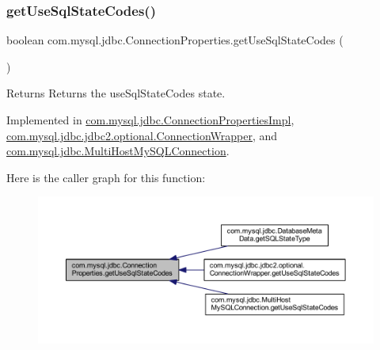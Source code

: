 \subsubsection{\texorpdfstring{get\+Use\+Sql\+State\+Codes()}{getUseSqlStateCodes()}}
{\footnotesize\ttfamily boolean com.\+mysql.\+jdbc.\+Connection\+Properties.\+get\+Use\+Sql\+State\+Codes (\begin{DoxyParamCaption}{ }\end{DoxyParamCaption})}

\begin{DoxyReturn}{Returns}
Returns the use\+Sql\+State\+Codes state. 
\end{DoxyReturn}


Implemented in \mbox{\hyperlink{classcom_1_1mysql_1_1jdbc_1_1_connection_properties_impl_a3e42bff7235239786fc02a0fba94564d}{com.\+mysql.\+jdbc.\+Connection\+Properties\+Impl}}, \mbox{\hyperlink{classcom_1_1mysql_1_1jdbc_1_1jdbc2_1_1optional_1_1_connection_wrapper_a2edc5b51339d1e377af614a97cc844ad}{com.\+mysql.\+jdbc.\+jdbc2.\+optional.\+Connection\+Wrapper}}, and \mbox{\hyperlink{classcom_1_1mysql_1_1jdbc_1_1_multi_host_my_s_q_l_connection_a37a3f2b05b0f82fbc27d8a197bb6cd70}{com.\+mysql.\+jdbc.\+Multi\+Host\+My\+S\+Q\+L\+Connection}}.

Here is the caller graph for this function\+:\nopagebreak
\begin{figure}[H]
\begin{center}
\leavevmode
\includegraphics[width=350pt]{interfacecom_1_1mysql_1_1jdbc_1_1_connection_properties_a399c463bcd4def7a8476647b2e09fd72_icgraph}
\end{center}
\end{figure}
\mbox{\label{interfacecom_1_1mysql_1_1jdbc_1_1_connection_properties_a7776bd98c8537739178d1c9a42bd9e8c}} 
